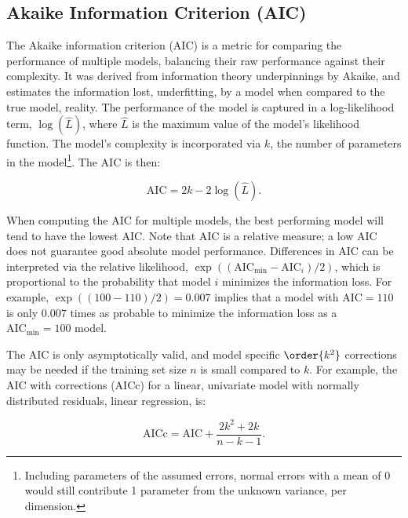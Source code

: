 \subsection{Akaike Information Criterion (AIC)}
\label{ml_general:eval:AIC}

The Akaike information criterion (AIC) \cite{1100705}
is a metric for comparing the performance of multiple models,
balancing their raw performance against their complexity.
It was derived from information theory underpinnings by Akaike,
and estimates the information lost, \ie underfitting,
by a model when compared to the true model, \ie reality.
The performance of the model is captured in a
log-likelihood term, $\log\left(\hat{L}\right)$,
where $\hat{L}$ is the maximum value of the model's likelihood function.
The model's complexity is incorporated via $k$, the number of parameters in the model\footnote{Including parameters of the assumed errors,
\eg \iid normal errors with a mean of 0 would still contribute 1 parameter from the unknown variance, per dimension.}.
The AIC is then:

\begin{equation} \label{eq:AIC}
\text{AIC} = 2k - 2\log\left(\hat{L}\right).
\end{equation}

When computing the AIC for multiple models,
the best performing model will tend to have the lowest AIC.
Note that AIC is a relative measure;
a low AIC does not guarantee good absolute model performance.
Differences in AIC can be interpreted via the relative likelihood,
$\exp\left(\left(\text{AIC}_{\text{min}} - \text{AIC}_{i}\right)/2\right)$,
which is proportional to the probability that model $i$ minimizes the information loss.
For example, $\exp\left(\left(100 - 110\right)/2\right) = \num{0.007}$ implies that
a model with $\text{AIC} = 110$ is only $\num{0.007}$ times as probable
to minimize the information loss as a $\text{AIC}_{\text{min}} = 100$ model.

The AIC is only asymptotically valid,
and model specific $\order{k^{2}}$ corrections may be needed
if the training set size $n$ is small compared to $k$.
For example, the AIC with corrections (AICc) for a linear,
univariate model with normally distributed residuals, \ie linear regression, is:

\begin{equation} \label{eq:AICc}
\text{AICc} = \text{AIC} + \frac{2k^{2}+2k}{n-k-1}.
\end{equation}

